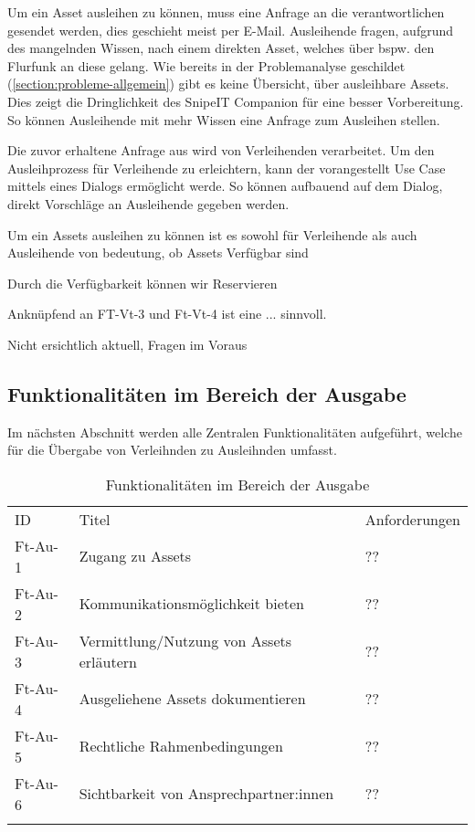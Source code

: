\label{subsubsection:Ag-Vt-1}
Um ein Asset ausleihen zu können, muss eine Anfrage an die verantwortlichen gesendet werden, dies
geschieht meist per E-Mail. Ausleihende fragen, aufgrund des mangelnden Wissen, nach einem direkten
Asset, welches über bspw. den Flurfunk an diese gelang. Wie bereits in der Problemanalyse geschildet
(\ref{section:probleme-allgemein}) gibt es keine Übersicht, über ausleihbare Assets. Dies zeigt die
Dringlichkeit des SnipeIT Companion für eine besser Vorbereitung. So können Ausleihende mit mehr
Wissen eine Anfrage zum Ausleihen stellen.

Die zuvor erhaltene Anfrage aus  wird von Verleihenden verarbeitet.
Um den Ausleihprozess für Verleihende zu erleichtern, kann der vorangestellt Use Case mittels eines
Dialogs ermöglicht werde. So können aufbauend auf dem Dialog, direkt Vorschläge an Ausleihende gegeben
werden.

Um ein Assets ausleihen zu können ist es sowohl für Verleihende als auch Ausleihende von bedeutung,
ob Assets Verfügbar sind

Durch die Verfügbarkeit können wir Reservieren

Anknüpfend an FT-Vt-3 und Ft-Vt-4 ist eine ... sinnvoll.

Nicht ersichtlich aktuell, Fragen im Voraus

\subsection{Funktionalitäten im Bereich der Ausgabe}
Im nächsten Abschnitt werden alle Zentralen Funktionalitäten aufgeführt, welche für die Übergabe von
Verleihnden zu Ausleihnden umfasst.
\begin{table}[h]
    \centering
    \caption{Funktionalitäten im Bereich der Ausgabe}
    \begin{tabular}{lll}
        \arrayrulecolor{maincolor}\hline
        \sffamily\color{maincolor}ID & \sffamily\color{maincolor}Titel          &
        \sffamily\color{maincolor}Anforderungen                                      \\
        \arrayrulecolor{maincolor}\hline
        Ft-Au-1                      & Zugang zu Assets                         & ?? \\
        Ft-Au-2                      & Kommunikationsmöglichkeit bieten         & ?? \\
        Ft-Au-3                      & Vermittlung/Nutzung von Assets erläutern & ?? \\
        Ft-Au-4                      & Ausgeliehene Assets dokumentieren        & ?? \\
        Ft-Au-5                      & Rechtliche Rahmenbedingungen             & ?? \\
        Ft-Au-6                      & Sichtbarkeit von Ansprechpartner:innen   & ?? \\
        \arrayrulecolor{maincolor}\hline
    \end{tabular}
    \label{table:ft-Au}
\end{table}


